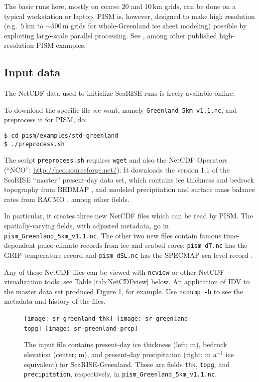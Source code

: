 The basic runs here, mostly on coarse $20$ and $10\,\textrm{km}$ grids, can be done on a typical workstation or laptop.  PISM is, however, designed to make high resolution (e.g.~$5\,\textrm{km}$ to $\sim500\,\textrm{m}$ grids for whole-Greenland ice sheet modeling) possible by exploiting large-scale parallel processing.  See \cite{AschwandenAdalgeirsdottirKhroulev,Golledgeetal2012,Golledgeetal2013}, among other published high-resolution PISM examples.


\subsection{Input data}

The NetCDF data used to initialize SeaRISE runs is freely-available online: 
\medskip

\centerline{}
\medskip

\noindent To download the specific file we want, namely \texttt{Greenland_5km_v1.1.nc}, and preprocess it for PISM, do:
\begin{verbatim}
$ cd pism/examples/std-greenland
$ ./preprocess.sh
\end{verbatim}
\noindent The script \texttt{preprocess.sh} requires \texttt{wget} and also the NetCDF Operators (``NCO''; \url{http://nco.sourceforge.net/}).  It downloads the version 1.1 of the SeaRISE ``master'' present-day data set, which contains ice thickness and bedrock topography from BEDMAP \cite{BamberLayberryGogenini}, and modeled precipitation and surface mass balance rates from RACMO \cite{Ettemaetal2009}, among other fields.

In particular, it creates three new NetCDF files which can be read by PISM.  The spatially-varying fields, with adjusted metadata, go in \texttt{pism_Greenland_5km_v1.1.nc}.  The other two new files contain famous time-dependent paleo-climate records from ice and seabed cores: \texttt{pism_dT.nc} has the GRIP temperature record \cite{JohnsenetalGRIP} and \texttt{pism_dSL.nc} has the SPECMAP sea level record \cite{Imbrieetal1984}.

Any of these NetCDF files can be viewed with \texttt{ncview} or other NetCDF visualization tools; see Table \ref{tab:NetCDFview} below.  An application of IDV to the master data set produced Figure \ref{fig:sr-input}, for example.  Use \texttt{ncdump -h} to see the metadata and history of the files.

\begin{figure}[ht]
\centering
\mbox{\texttt{[image: sr-greenland-thk]}
  \qquad
  \texttt{[image: sr-greenland-topg]}
  \qquad
  \texttt{[image: sr-greenland-prcp]}}
\caption{The input file contains present-day ice thickness (left; m), bedrock elevation (center; m), and present-day precipitation (right; m $\text{a}^{-1}$ ice equivalent) for SeaRISE-Greenland.  These are fields \texttt{thk}, \texttt{topg}, and \texttt{precipitation}, respectively, in \texttt{pism_Greenland_5km_v1.1.nc}.}
\label{fig:sr-input}
\end{figure}


